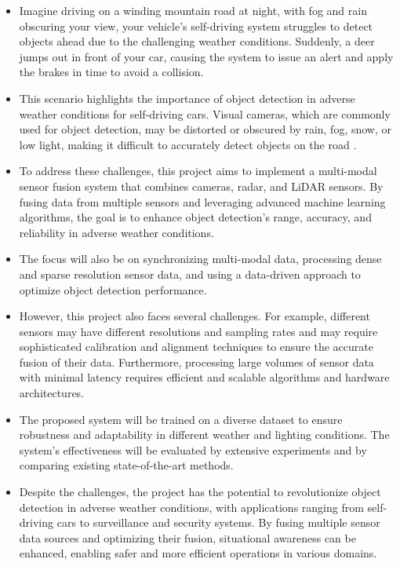\documentclass[rnd]{mas_proposal}
\begin{document}
\begin{itemize}
    \item Imagine driving on a winding mountain road at night, with fog and rain obscuring your view, your vehicle's self-driving system struggles to detect objects ahead due to the challenging weather conditions. Suddenly, a deer jumps out in front of your car, causing the system to issue an alert and apply the brakes in time to avoid a collision.
    
    \item This scenario highlights the importance of object detection in adverse weather conditions for self-driving cars. Visual cameras, which are commonly used for object detection, may be distorted or obscured by rain, fog, snow, or low light, making it difficult to accurately detect objects on the road \cite{yurtsever2020survey} \cite{carballo2020libre} \cite{mcity2020}.
    
    \item To address these challenges, this project aims to implement a multi-modal sensor fusion system that combines cameras, radar, and LiDAR sensors. By fusing data from multiple sensors and leveraging advanced machine learning algorithms, the goal is to enhance object detection's range, accuracy, and reliability in adverse weather conditions.
    
    \item The focus will also be on synchronizing multi-modal data, processing dense and sparse resolution sensor data, and using a data-driven approach to optimize object detection performance.
    
    \item However, this project also faces several challenges. For example, different sensors may have different resolutions and sampling rates and may require sophisticated calibration and alignment techniques to ensure the accurate fusion of their data. Furthermore, processing large volumes of sensor data with minimal latency requires efficient and scalable algorithms and hardware architectures.
    
    \item The proposed system will be trained on a diverse dataset to ensure robustness and adaptability in different weather and lighting conditions. The system's effectiveness will be evaluated by extensive experiments and by comparing existing state-of-the-art methods.
    
    \item Despite the challenges, the project has the potential to revolutionize object detection in adverse weather conditions, with applications ranging from self-driving cars to surveillance and security systems. By fusing multiple sensor data sources and optimizing their fusion, situational awareness can be enhanced, enabling safer and more efficient operations in various domains.
    

\end{itemize}
\end{document}
